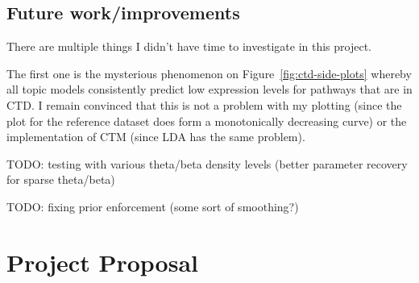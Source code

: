 \documentclass[12pt,a4paper,twoside,openright]{report}
\begin{document}
\section{Future work/improvements}

There are multiple things I didn't have time to investigate in this project.

The first one is the mysterious phenomenon on Figure~\ref{fig:ctd-side-plots} whereby all topic models consistently predict low expression levels for pathways that are in CTD. I remain convinced that this is not a problem with my plotting (since the plot for the reference dataset does form a monotonically decreasing curve) or the implementation of CTM (since LDA has the same problem).

TODO: testing with various theta/beta density levels (better parameter recovery for sparse theta/beta)

TODO: fixing prior enforcement (some sort of smoothing?)




\appendix

\chapter{Project Proposal}


\end{document}
